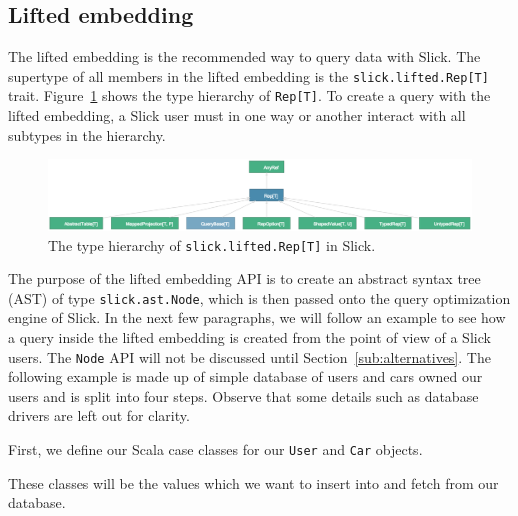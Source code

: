 \subsection{Lifted embedding} %
\label{sub:LiftedEmbedding}
The lifted embedding is the recommended way to query data with Slick.
The supertype of all members in the lifted embedding is the \texttt{slick.lifted.Rep[T]} trait.
Figure~\ref{fig:rep} shows the type hierarchy of \texttt{Rep[T]}.
To create a query with the lifted embedding, a Slick user must in one way or another interact with all subtypes in the hierarchy.
\begin{figure}
    \centering
    \includegraphics[width=\textwidth]{img/rep.png}
    \caption{The type hierarchy of \texttt{slick.lifted.Rep[T]} in Slick.}\label{fig:rep}
\end{figure}
The purpose of the lifted embedding API is to create an abstract syntax tree (AST) of type \texttt{slick.ast.Node}, which is then passed onto the query optimization engine of Slick.
In the next few paragraphs, we will follow an example to see how a query inside the lifted embedding is created from the point of view of a Slick users.
The \texttt{Node} API will not be discussed until Section~\ref{sub:alternatives}.
The following example is made up of simple database of users and cars owned our users and is split into four steps.
Observe that some details such as database drivers are left out for clarity.


First, we define our Scala case classes for our \texttt{User} and \texttt{Car} objects.

These classes will be the values which we want to insert into and fetch from our database.

